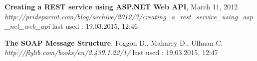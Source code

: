 \documentclass[12pt]{article}
\begin{document}
\begin{thebibliography}{56}
  \textbf{Creating a REST service using ASP.NET Web API},  March 11, 2012\\
  \textit{http://prideparrot.com/blog/archive/2012/3/creating\_a\_rest\_service\_using\_asp\_net\_web\_api 	 }
  \newline last used : 19.03.2015, 12:46


  \textbf{The SOAP Message Structure},  Foggon D.,  Maharry D.,  Ullman C.\\
  \textit{http://flylib.com/books/en/2.439.1.22/1/}
  \newline last used : 19.03.2015, 12:47

 	 
 	 
 	 
\end{thebibliography}
\end{document}
